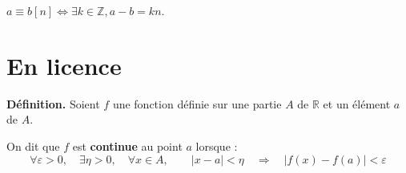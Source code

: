\documentclass[10pt,french]{article}
\begin{document}
$a \equiv b [n] \Leftrightarrow \exists k \in \mathds Z, a - b = kn$.

\section{En licence}
\textbf{Définition.} Soient $f$ une fonction définie sur une partie $A$ de $\mathds{R}$
et un élément $a$ de $A$.\par
On dit que $f$ est \textbf{continue} au point $a$ lorsque :
\[\forall \varepsilon > 0,\quad
\exists \eta > 0,\quad
\forall x \in A,\qquad
\left\vert x- a \right\vert < \eta \quad \Rightarrow \quad
\left\vert f(x) - f(a) \right\vert < \varepsilon\]
\end{document}
